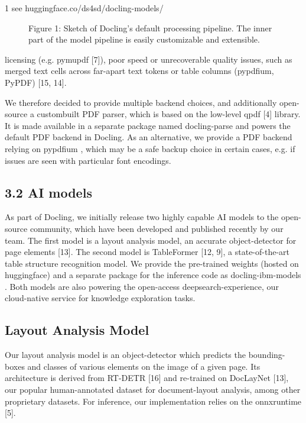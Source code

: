 1 see huggingface.co/ds4sd/docling-models/

\begin{figure}[h]
\caption{Figure 1: Sketch of Docling's default processing pipeline. The inner part of the model pipeline is easily customizable and extensible.}
\end{figure}

licensing (e.g. pymupdf [7]), poor speed or unrecoverable quality issues, such as merged text cells across far-apart text tokens or table columns (pypdfium, PyPDF) [15, 14].

We therefore decided to provide multiple backend choices, and additionally open-source a custombuilt PDF parser, which is based on the low-level qpdf [4] library. It is made available in a separate package named docling-parse and powers the default PDF backend in Docling. As an alternative, we provide a PDF backend relying on pypdfium , which may be a safe backup choice in certain cases, e.g. if issues are seen with particular font encodings.

\subsection{3.2 AI models}

As part of Docling, we initially release two highly capable AI models to the open-source community, which have been developed and published recently by our team. The first model is a layout analysis model, an accurate object-detector for page elements [13]. The second model is TableFormer [12, 9], a state-of-the-art table structure recognition model. We provide the pre-trained weights (hosted on huggingface) and a separate package for the inference code as docling-ibm-models . Both models are also powering the open-access deepsearch-experience, our cloud-native service for knowledge exploration tasks.

\subsection{Layout Analysis Model}

Our layout analysis model is an object-detector which predicts the bounding-boxes and classes of various elements on the image of a given page. Its architecture is derived from RT-DETR [16] and re-trained on DocLayNet [13], our popular human-annotated dataset for document-layout analysis, among other proprietary datasets. For inference, our implementation relies on the onnxruntime [5].

